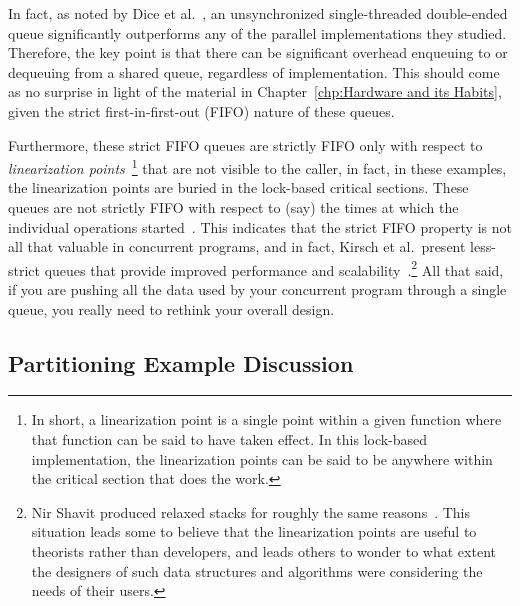 \QuickQuizEnd

In fact, as noted by Dice et al.~\cite{DavidDice:2010:SCA:HTM:deque},
an unsynchronized single-threaded double-ended queue significantly
outperforms any of the parallel implementations they studied.
Therefore, the key point is that there can be significant overhead enqueuing to
or dequeuing from a shared queue, regardless of implementation.
This should come as no surprise in light of the material in
Chapter~\ref{chp:Hardware and its Habits}, given the strict
first-in-first-out (FIFO) nature of these queues.

Furthermore, these strict FIFO queues are strictly FIFO only with
respect to
\emph{linearization points}~\cite{Herlihy:1990:LCC:78969.78972}\footnote{
	In short, a linearization point is a single point within a given
	function where that function can be said to have taken effect.
	In this lock-based implementation, the linearization points
	can be said to be anywhere within the critical section that
	does the work.}
that are not visible to the caller, in fact, in these examples,
the linearization points are buried in the lock-based critical
sections.
These queues are not strictly FIFO with respect to (say) the times at which
the individual operations started~\cite{AndreasHaas2012FIFOisnt}.
This indicates that the strict FIFO property is not all that valuable
in concurrent programs, and in fact, Kirsch et al.\ present less-strict
queues that provide improved performance and
scalability~\cite{ChristophMKirsch2012FIFOisntTR}.\footnote{
	Nir Shavit produced relaxed stacks for roughly the same
	reasons~\cite{Shavit:2011:DSM:1897852.1897873}.
	This situation leads some to believe that the linearization
	points are useful to theorists rather than developers, and
	leads others to wonder to what extent the designers of such
	data structures and algorithms were considering the needs
	of their users.}
All that said, if you are pushing all the data used by your concurrent
program through a single queue, you really need to rethink your
overall design.

\subsection{Partitioning Example Discussion}
\label{sec:SMPdesign:Partitioning Example Discussion}

